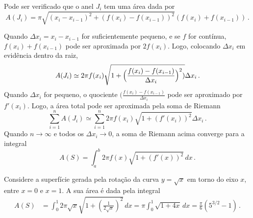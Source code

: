 \begin{center}
\begin{bmlimage}
\end{bmlimage}
\end{center}

Pode ser verificado que o anel $J_i$ tem uma área dada por 
\begin{equation}\label{eq_area_anel}
A(J_i)=\pi\sqrt{(x_i-x_{i-1})^2+(f(x_i)-f(x_{i-1}))^2}(f(x_i)+f(x_{i-1}))\,.
\end{equation}

Quando $\Delta x_i=x_i-x_{i-1}$ for suficientemente pequeno, e se
$f$ for contínua, $f(x_i)+f(x_{i-1})$ pode ser aproximada por
$2f(x_i)$.
Logo, colocando $\Delta x_i$ em evidência dentro da raiz,
\begin{equation}
A(J_i)\simeq 2 \pi f(x_i)\sqrt{1+\Bigl(\frac{f(x_i)-f(x_{i-1})}{\Delta
x_i}\Bigr)^2)}\Delta x_i\,.
\end{equation}
Quando $\Delta x_i$ for pequeno, o quociente $(\frac{f(x_i)-f(x_{i-1})}{\Delta
x_i}$ pode ser aproximado por $f'(x_i)$. Logo, a 
área total pode ser aproximada pela soma de Riemann
$$
\sum_{i=1}^n A(J_i)\simeq \sum_{i=1}^n 
2\pi f(x_i)\sqrt{1+(f'(x_i))^2}\Delta x_i\,. 
$$
Quando $n\to \infty$ e todos os $\Delta x_i\to 0$, a soma de
Riemann acima converge para a integral
\begin{equation}
A(S)=\int_a^b2\pi f(x)\sqrt{1+(f'(x))^2}\,dx\,.
\end{equation}

\begin{ex}
Considere a superfície gerada pela rotação da curva
$y=\sqrt{x}$ em torno do eixo $x$, entre $x=0$ e $x=1$. A sua
área é dada pela integral 
\begin{align*}
A(S)&=\int_0^1
2\pi\sqrt{x}\sqrt{1+(\tfrac{1}{2\sqrt{x}})^2}\,dx=
\pi\int_0^1 \sqrt{1+4 x}\,dx=\tfrac{\pi}{6}(5^{3/2}-1)\,.
\end{align*}
\end{ex}

